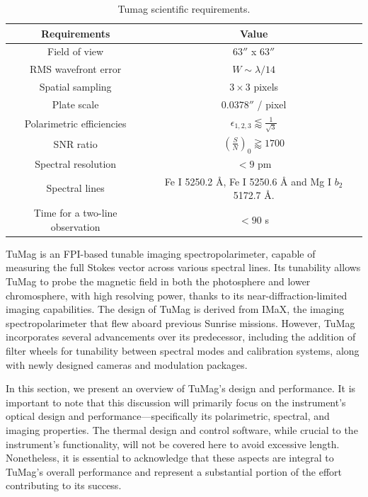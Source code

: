 \begin{table}
    \centering
   \begin{tabular}{cc}
    \hline
    \hline
    Requirements & Value \\
    \hline
    Field of view & $63''$ x $63''$ \\
    RMS wavefront error & $W \sim \lambda / 14$\\
    Spatial sampling & $3 \times 3 $ pixels \\
    Plate scale & $0.0378''$ / pixel \\
    Polarimetric efficiencies & $\epsilon _ {1, 2, 3} \lessapprox \frac{1}{\sqrt{3}}$\\
    SNR ratio & $\left(\frac{S}{N}\right) _ 0 \gtrapprox 1700$ \\
    Spectral resolution & $< 9$ pm\\  
    Spectral lines & Fe I 5250.2 \r{A}, Fe I 5250.6 \r{A} and Mg I $b_2$ 5172.7 \r{A}. \\
    Time for a two-line observation & $< 90$ s\\
    \hline
    \hline
    \end{tabular}
    \caption{Tumag scientific requirements.}
    \label{table: Tumags requirements}
\end{table}

TuMag is an FPI-based tunable imaging spectropolarimeter, capable of measuring the full Stokes vector across various spectral lines. Its tunability allows TuMag to probe the magnetic field in both the photosphere and lower chromosphere, with high resolving power, thanks to its near-diffraction-limited imaging capabilities. The design of TuMag is derived from IMaX, the imaging spectropolarimeter that flew aboard previous Sunrise missions. However, TuMag incorporates several advancements over its predecessor, including the addition of filter wheels for tunability between spectral modes and calibration systems, along with newly designed cameras and modulation packages.

In this section, we present an overview of TuMag's design and performance. It is important to note that this discussion will primarily focus on the instrument's optical design and performance—specifically its polarimetric, spectral, and imaging properties. The thermal design and control software, while crucial to the instrument’s functionality, will not be covered here to avoid excessive length. Nonetheless, it is essential to acknowledge that these aspects are integral to TuMag’s overall performance and represent a substantial portion of the effort contributing to its success.

